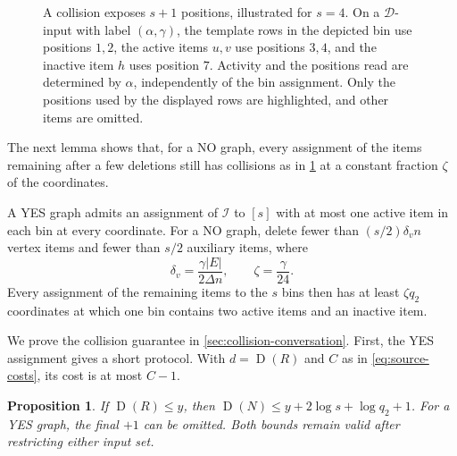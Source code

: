 \documentclass[11pt,letterpaper]{article} \usepackage[utf8]{inputenc}
\theoremstyle{plain} \newtheorem{theorem}{Theorem}[section]
\newtheorem{proposition}[proposition]{Proposition}
\theoremstyle{definition} \newaliascnt{definition}{theorem}
\newcommand{\D}{\operatorname{D}}
\begin{document}
\begin{figure}[H]
\caption{A collision exposes \(s+1\) positions, illustrated for \(s=4\).
On a \(\mathcal D\)-input with label \((\alpha,\gamma)\), the template
rows in the depicted bin use positions \(1,2\), the active items
\(u,v\) use positions \(3,4\), and the inactive item \(h\) uses
position \(7\). Activity and the positions read are determined by
\(\alpha\), independently of the bin assignment. Only the positions
used by the displayed rows are highlighted, and other items are omitted.}
\label{fig:source-collision}
\end{figure}

The next lemma shows that, for a NO graph, every assignment of the items
remaining after a few deletions still has collisions as in
\cref{fig:source-collision} at a constant fraction \(\zeta\) of the
coordinates.

\begin{lemma}
\label{src:item-witness}
A YES graph admits an assignment of \(\mathcal I\) to \([s]\) with at most one
active item in each bin at every coordinate. For a NO graph, delete fewer than
\((s/2)\delta_v n\) vertex items and fewer than \(s/2\) auxiliary items, where
\[
\delta_v=\frac{\gamma|E|}{2\Delta n},\qquad \zeta=\frac{\gamma}{24}.
\]
Every assignment of the remaining items to the \(s\) bins then has at least
\(\zeta q_2\) coordinates at which one bin contains two active items and an
inactive item.
\end{lemma}

We prove the collision guarantee in \cref{sec:collision-conversation}.
First, the YES assignment gives a short protocol. With \(d=\D(R)\) and \(C\) as in
\eqref{eq:source-costs}, its cost is at most \(C-1\).

\begin{proposition}
\label{src:upper}
If \(\D(R)\le y\), then \(\D(N)\le y+2\log s+\log q_2+1\). For a YES graph, the
final \(+1\) can be omitted. Both bounds remain valid after restricting either
input set.
\end{proposition}
\end{document}
